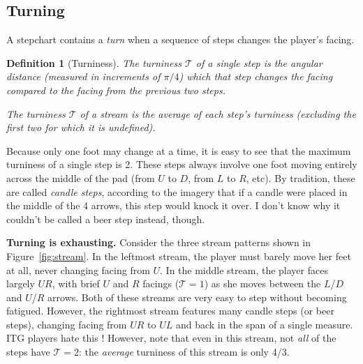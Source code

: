 \documentclass[10pt]{sigplanconf}
\begin{document}
\subsection{Turning}

A stepchart contains a {\em turn} when a sequence of steps changes the player's facing.

\newtheorem{definition}{Definition}
\begin{definition}[Turniness]
	The turniness $\mathcal{T}$ of a single step is the angular distance (measured in increments of $\pi/4$) which that step changes the facing compared to the facing from the previous two steps.

	The turniness $\mathcal{T}$ of a stream is the average of each step's turniness (excluding the first two for which it is undefined).
\end{definition}

Because only one foot may change at a time, it is easy to see that the maximum turniness of a single step is 2.
These steps always involve one foot moving entirely across the middle of the pad (from $U$ to $D$, from $L$ to $R$, etc).
By tradition, these are called {\em candle steps}, according to the imagery that if a candle were placed in the middle of the 4 arrows, this step would knock it over. I don't know why it couldn't be called a beer step instead, though.

{\bf Turning is exhausting.} Consider the three stream patterns shown in Figure~\ref{fig:stream}.
In the leftmost stream, the player must barely move her feet at all, never changing facing from $U$.
In the middle stream, the player faces largely $UR$, with brief $U$ and $R$ facings ($\mathcal{T}=1$) as she moves between the $L$/$D$ and $U$/$R$ arrows.
Both of these streams are very easy to step without becoming fatigued.
However, the rightmost stream features many candle steps (or beer steps), changing facing from $UR$ to $UL$ and back in the span of a single measure.
ITG players hate this \cite{weirdtrick}!
However, note that even in this stream, not {\em all} of the steps have $\mathcal{T}=2$: the {\em average} turniness of this stream is only 4/3.
\end{document}
